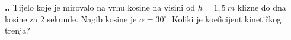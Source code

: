 

\noindent 
\textbf{
\thecjelina.\thezadatak.}
Tijelo koje je mirovalo na vrhu kosine na visini od $h=1,5\ m$ klizne do dna kosine za $2$ sekunde. Nagib kosine je $\alpha=30^\circ$. Koliki je koeficijent kinetičkog trenja?






